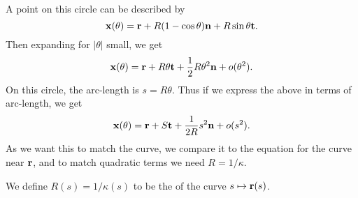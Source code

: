 \documentclass[a4paper]{scrreprt}
\begin{document}
A point on this circle can be described by
$$
\mathbf{x}(\theta) = \mathbf{r} + R(1 - \cos \theta) \mathbf{n} + R \sin \theta \mathbf{t}.
$$
Then expanding for $|\theta|$ small, we get
$$
\mathbf{x} (\theta) = \mathbf{r} + R \theta \mathbf{t} + \frac{1}{2} R \theta^2 \mathbf{n} + o(\theta^2).
$$
On this circle, the arc-length is $s = R \theta$. Thus if we express the above in terms of arc-length, we get
$$
\mathbf{x}(\theta) = \mathbf{r} + S \mathbf{t} + \frac{1}{2R} s^2 \mathbf{n} + o(s^2).
$$
As we want this to match the curve, we compare it to the equation for the curve near $\mathbf{r}$, and to match quadratic terms we need
$R = 1/\kappa$.

\begin{definition}
	We define $R(s)=1/\kappa(s)$ to be the  of the curve $s \mapsto \mathbf{r}(s)$.
\end{definition}
\end{document}
